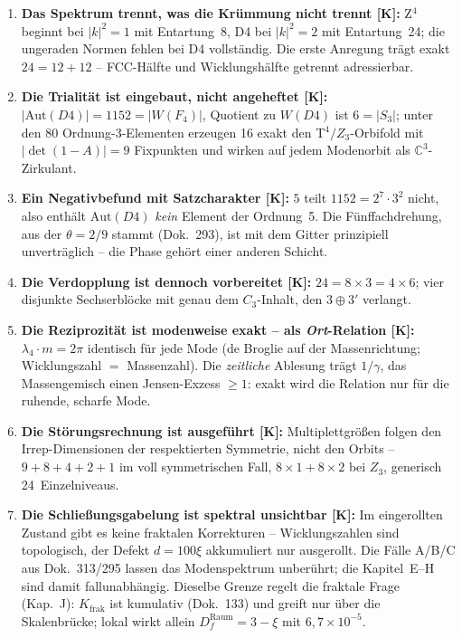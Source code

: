 \documentclass[11pt]{report}
\begin{document}
\begin{enumerate}
  \item \textbf{Das Spektrum trennt, was die Krümmung nicht trennt
        [K]:} Z$^4$ beginnt bei $|k|^2 = 1$ mit Entartung~8, D4 bei
        $|k|^2 = 2$ mit Entartung~24; die ungeraden Normen fehlen
        bei D4 vollständig. Die erste Anregung trägt exakt
        $24 = 12+12$ -- FCC-Hälfte und Wicklungshälfte getrennt
        adressierbar.
  \item \textbf{Die Trialität ist eingebaut, nicht angeheftet [K]:}
        $|\text{Aut}(D4)| = 1152 = |W(F_4)|$, Quotient zu $W(D4)$
        ist $6 = |S_3|$; unter den 80 Ordnung-3-Elementen erzeugen
        16 exakt den T$^4/Z_3$-Orbifold mit $|\det(1-A)| = 9$
        Fixpunkten und wirken auf jedem Modenorbit als
        $\mathbb{C}^3$-Zirkulant.
  \item \textbf{Ein Negativbefund mit Satzcharakter [K]:} $5$ teilt
        $1152 = 2^7\cdot3^2$ nicht, also enthält $\text{Aut}(D4)$
        \emph{kein} Element der Ordnung~5. Die Fünffachdrehung, aus
        der $\theta = 2/9$ stammt (Dok.~293), ist mit dem Gitter
        prinzipiell unverträglich -- die Phase gehört einer
        anderen Schicht.
  \item \textbf{Die Verdopplung ist dennoch vorbereitet [K]:}
        $24 = 8\times3 = 4\times6$; vier disjunkte Sechserblöcke mit
        genau dem $C_3$-Inhalt, den $3\oplus3'$ verlangt.
  \item \textbf{Die Reziprozität ist modenweise exakt -- als
        \emph{Ort}-Relation [K]:} $\lambda_4\cdot m = 2\pi$
        identisch für jede Mode (de Broglie auf der
        Massenrichtung; Wicklungszahl $=$ Massenzahl). Die
        \emph{zeitliche} Ablesung trägt $1/\gamma$, das
        Massengemisch einen Jensen-Exzess $\ge1$: exakt wird die
        Relation nur für die ruhende, scharfe Mode.
  \item \textbf{Die Störungsrechnung ist ausgeführt [K]:}
        Multiplettgrößen folgen den Irrep-Dimensionen der
        respektierten Symmetrie, nicht den Orbits --
        $9+8+4+2+1$ im voll symmetrischen Fall, $8\times1+8\times2$
        bei $Z_3$, generisch 24~Einzelniveaus.
  \item \textbf{Die Schließungsgabelung ist spektral unsichtbar
        [K]:} Im eingerollten Zustand gibt es keine fraktalen
        Korrekturen -- Wicklungszahlen sind topologisch, der
        Defekt $d = 100\xi$ akkumuliert nur ausgerollt. Die
        Fälle A/B/C aus Dok.~313/295 lassen das Modenspektrum
        unberührt; die Kapitel~E--H sind damit fallunabhängig.
        Dieselbe Grenze regelt die fraktale Frage (Kap.~J):
        $K_\text{frak}$ ist kumulativ (Dok.~133) und greift nur
        über die Skalenbrücke; lokal wirkt allein
        $D_f^\text{Raum} = 3-\xi$ mit $6{,}7\times10^{-5}$.
\end{enumerate}
\end{document}
